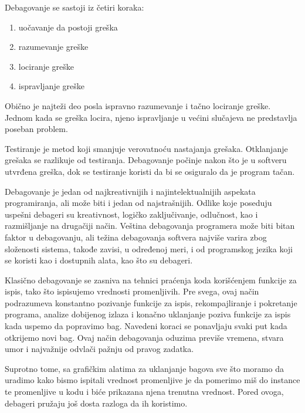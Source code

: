 \documentclass[a4paper]{article}
\begin{document}
\vspace{4mm}
Debagovanje se sastoji iz četiri koraka:
\begin{enumerate}
\item uočavanje da postoji greška
\item razumevanje greške
\item lociranje greške
\item ispravljanje greške
\end{enumerate}

\vspace{4mm}

Obično je najteži deo posla ispravno razumevanje i tačno lociranje greške. Jednom kada 
se greška locira, njeno ispravljanje u većini slučajeva ne predstavlja poseban problem.

Testiranje je metod koji smanjuje verovatnoću nastajanja grešaka.
Otklanjanje grešaka se razlikuje od testiranja. Debagovanje počinje
nakon što je u softveru utvrđena greška, dok se testiranje koristi da bi
se osiguralo da je program tačan.

Debagovanje je jedan od najkreativnijih i najintelektualnijih aspekata programiranja, 
ali može biti i jedan od najstrašnijih. Odlike koje poseduju uspešni debageri su 
kreativnost, logičko zaključivanje, odlučnost, kao i razmišljanje na drugačiji način.
Veština debagovanja programera može biti bitan faktor u debagovanju, ali težina 
debagovanja softvera najviše varira zbog složenosti sistema, takođe zavisi, u određenoj 
meri, i od programskog jezika koji se koristi kao i dostupnih alata, kao što su 
debageri. 

Klasično debagovanje se zasniva na tehnici praćenja koda korišćenjem funkcije za ispis, tako što 
ispisujemo vrednosti promenljivih. Pre svega, ovaj način podrazumeva konstantno pozivanje funkcije za 
ispis, rekompajliranje i pokretanje programa, analize dobijenog izlaza i konačno uklanjanje 
poziva funkcije za ispis kada uspemo da popravimo bag. Navedeni koraci se ponavljaju svaki put 
kada otkrijemo novi bag. Ovaj način debagovanja oduzima previše vremena, stvara umor i najvažnije
odvlači pažnju od pravog zadatka.

Suprotno tome, sa grafičkim alatima za uklanjanje bagova sve što moramo da uradimo kako bismo 
ispitali vrednost promenljive je da pomerimo miš do instance te promenljive u kodu i biće
prikazana njena trenutna vrednost. Pored ovoga, debageri pružaju još dosta razloga da ih koristimo.\cite{art_debugging}
\end{document}
